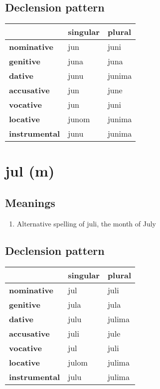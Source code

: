 \subsection*{Declension pattern}
\begin{tabularx}{\linewidth}{Xll}
\toprule
{} & singular &  plural \\
\midrule
\textbf{nominative  } &      jun &    juni \\
\textbf{genitive    } &     juna &    juna \\
\textbf{dative      } &     junu &  junima \\
\textbf{accusative  } &      jun &    june \\
\textbf{vocative    } &      jun &    juni \\
\textbf{locative    } &    junom &  junima \\
\textbf{instrumental} &     junu &  junima \\
\bottomrule
\end{tabularx}

\filbreak
\section{jul (m)}
\subsection*{Meanings}
\begin{enumerate}
\item Alternative spelling of juli, the month of July
\end{enumerate}
\subsection*{Declension pattern}
\begin{tabularx}{\linewidth}{Xll}
\toprule
{} & singular &  plural \\
\midrule
\textbf{nominative  } &      jul &    juli \\
\textbf{genitive    } &     jula &    jula \\
\textbf{dative      } &     julu &  julima \\
\textbf{accusative  } &     juli &    jule \\
\textbf{vocative    } &      jul &    juli \\
\textbf{locative    } &    julom &  julima \\
\textbf{instrumental} &     julu &  julima \\
\bottomrule
\end{tabularx}

